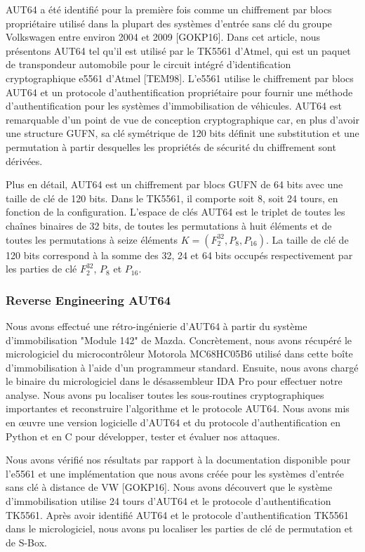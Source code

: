 \documentclass{template}
\begin{document}
AUT64 a été identifié pour la première fois comme un chiffrement par blocs propriétaire utilisé dans la plupart des systèmes d'entrée sans clé du groupe Volkswagen entre environ 2004 et 2009 [GOKP16]. Dans cet article, nous présentons AUT64 tel qu'il est utilisé par le TK5561 d'Atmel, qui est un paquet de transpondeur automobile pour le circuit intégré d'identification cryptographique e5561 d'Atmel [TEM98]. L'e5561 utilise le chiffrement par blocs AUT64 et un protocole d'authentification propriétaire pour fournir une méthode d'authentification pour les systèmes d'immobilisation de véhicules. AUT64 est remarquable d'un point de vue de conception cryptographique car, en plus d'avoir une structure GUFN, sa clé symétrique de 120 bits définit une substitution et une permutation à partir desquelles les propriétés de sécurité du chiffrement sont dérivées.

Plus en détail, AUT64 est un chiffrement par blocs GUFN de 64 bits avec une taille de clé de 120 bits. Dans le TK5561, il comporte soit 8, soit 24 tours, en fonction de la configuration. L'espace de clés AUT64 est le triplet de toutes les chaînes binaires de 32 bits, de toutes les permutations à huit éléments et de toutes les permutations à seize éléments $K = (F_2^{32}, P_8, P_{16})$. La taille de clé de 120 bits correspond à la somme des 32, 24 et 64 bits occupés respectivement par les parties de clé $F_2^{32}$, $P_8$ et $P_{16}$. 
\subsubsection{Reverse Engineering AUT64}
\baselineskip=16pt
Nous avons effectué une rétro-ingénierie d'AUT64 à partir du système d'immobilisation "Module 142" de Mazda. Concrètement, nous avons récupéré le micrologiciel du microcontrôleur Motorola MC68HC05B6 utilisé dans cette boîte d'immobilisation à l'aide d'un programmeur standard. Ensuite, nous avons chargé le binaire du micrologiciel dans le désassembleur IDA Pro pour effectuer notre analyse. Nous avons pu localiser toutes les sous-routines cryptographiques importantes et reconstruire l'algorithme et le protocole AUT64. Nous avons mis en œuvre une version logicielle d'AUT64 et du protocole d'authentification en Python et en C pour développer, tester et évaluer nos attaques.

Nous avons vérifié nos résultats par rapport à la documentation disponible pour l'e5561 et une implémentation que nous avons créée pour les systèmes d'entrée sans clé à distance de VW [GOKP16]. Nous avons découvert que le système d'immobilisation utilise 24 tours d'AUT64 et le protocole d'authentification TK5561. Après avoir identifié AUT64 et le protocole d'authentification TK5561 dans le micrologiciel, nous avons pu localiser les parties de clé de permutation et de S-Box.
\end{document}
